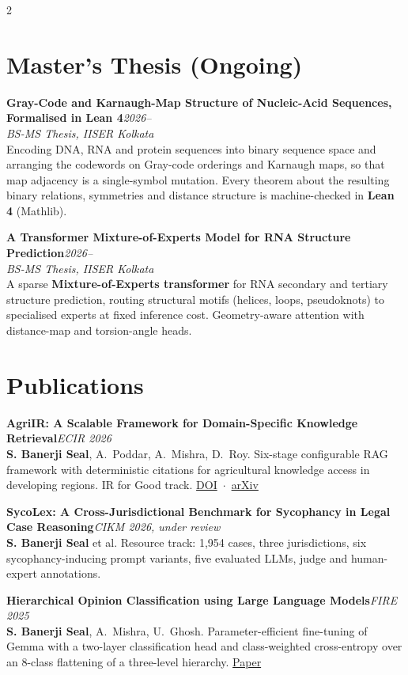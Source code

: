 \documentclass[a4paper,10.5pt]{extarticle}
\newcommand{\entry}[3]{%
  {\normalsize\textbf{#1}}\hfill{\small\itshape\textcolor{mutedtext}{#2}}\\[0.04em]
  {\small #3}\par\vspace{3pt}%
}
\newcommand{\entryv}[4]{%
  {\normalsize\textbf{#1}}\hfill{\small\itshape\textcolor{mutedtext}{#2}}\\[0.04em]
  {\small\itshape\textcolor{mutedtext}{#3}}\\[0.04em]
  {\small #4}\par\vspace{3pt}%
}
\begin{document}
\begin{paracol}{2}

\section{Master's Thesis (Ongoing)}

\entryv{Gray-Code and Karnaugh-Map Structure of Nucleic-Acid Sequences, Formalised in Lean 4}{2026--}{BS-MS Thesis, IISER Kolkata}{%
Encoding DNA, RNA and protein sequences into binary sequence space and arranging the codewords on Gray-code orderings and Karnaugh maps, so that map adjacency is a single-symbol mutation. Every theorem about the resulting binary relations, symmetries and distance structure is machine-checked in \textbf{Lean 4} (Mathlib).}

\entryv{A Transformer Mixture-of-Experts Model for RNA Structure Prediction}{2026--}{BS-MS Thesis, IISER Kolkata}{%
A sparse \textbf{Mixture-of-Experts transformer} for RNA secondary and tertiary structure prediction, routing structural motifs (helices, loops, pseudoknots) to specialised experts at fixed inference cost. Geometry-aware attention with distance-map and torsion-angle heads.}

\section{Publications}

\entry{AgriIR: A Scalable Framework for Domain-Specific Knowledge Retrieval}{ECIR 2026}{%
\textbf{S. Banerji Seal}, A.~Poddar, A.~Mishra, D.~Roy. Six-stage configurable RAG framework with deterministic citations for agricultural knowledge access in developing regions. IR for Good track. \href{https://doi.org/10.1007/978-3-032-21324-2_37}{DOI}~$\cdot$~\href{https://arxiv.org/abs/2604.16353}{arXiv}}

\entry{SycoLex: A Cross-Jurisdictional Benchmark for Sycophancy in Legal Case Reasoning}{CIKM 2026, under review}{%
\textbf{S. Banerji Seal} et al. Resource track: 1,954 cases, three jurisdictions, six sycophancy-inducing prompt variants, five evaluated LLMs, judge and human-expert annotations.}

\entry{Hierarchical Opinion Classification using Large Language Models}{FIRE 2025}{%
\textbf{S. Banerji Seal}, A.~Mishra, U.~Ghosh. Parameter-efficient fine-tuning of Gemma with a two-layer classification head and class-weighted cross-entropy over an 8-class flattening of a three-level hierarchy. \href{https://ceur-ws.org/Vol-4173/T10-3.pdf}{Paper}}


\end{paracol}
\end{document}
